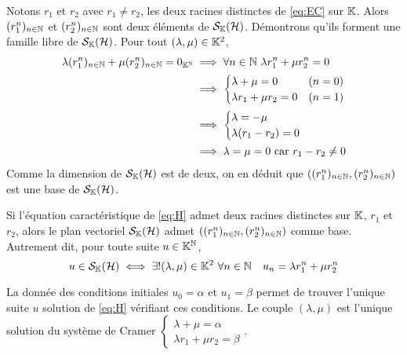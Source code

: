 Notons \(r_1\) et \(r_2\) avec \(r_1 \neq r_2\), les deux racines distinctes de \eqref{eq:EC} sur \(\mathbb{K}\). Alors \((r_1^n)_{n \in \mathbb{N}}\) et \((r_2^n)_{n \in \mathbb{N}}\) sont deux éléments de \(\mathcal{S}_{\mathbb{K}}(\mathcal{H})\). Démontrons qu'ils forment une famille libre de \(\mathcal{S}_{\mathbb{K}}(\mathcal{H})\). Pour tout \((\lambda, \mu) \in \mathbb{K}^2\),
\begin{align}
  \lambda (r_1^n)_{n \in \mathbb{N}} + \mu (r_2^n)_{n \in \mathbb{N}} = 0_{\mathbb{K}^{\mathbb{N}}} &\implies \forall n \in \mathbb{N} \ \lambda r_1^n + \mu r_2^n=0\\
                                                                  &\implies \begin{cases} \lambda + \mu =0 & (n=0) \\ \lambda r_1 +\mu r_2 = 0 & (n=1) \end{cases}\\
                                                                  &\implies \begin{cases} \lambda = -\mu \\ \lambda(r_1-r_2)=0 \end{cases}\\
                                                                  &\implies \lambda=\mu=0 \text{~car } r_1-r_2 \neq 0
\end{align}
Comme la dimension de \(\mathcal{S}_{\mathbb{K}}(\mathcal{H})\) est de deux, on en déduit que \(((r_1^n)_{n \in \mathbb{N}},(r_2^n)_{n \in \mathbb{N}})\) est une base de \(\mathcal{S}_{\mathbb{K}}(\mathcal{H})\).

\begin{theo}
  Si l'équation caractéristique de \eqref{eq:H} admet deux racines distinctes sur \(\mathbb{K}\), \(r_1\) et \(r_2\), alors le plan vectoriel \(\mathcal{S}_{\mathbb{K}}(\mathcal{H})\) admet \(((r_1^n)_{n \in \mathbb{N}},(r_2^n)_{n \in \mathbb{N}})\) comme base. Autrement dit, pour toute suite \(u \in \mathbb{K}^{\mathbb{N}}\),
  \begin{equation}
    u \in \mathcal{S}_{\mathbb{K}}(\mathcal{H}) \iff \exists! (\lambda,\mu) \in \mathbb{K}^2 \ \forall n \in \mathbb{N} \quad u_n = \lambda r_1^n +\mu r_2^n
  \end{equation}
\end{theo}

La donnée des conditions initiales \(u_0=\alpha\) et \(u_1=\beta\) permet de trouver l'unique suite \(u\) solution de \eqref{eq:H} vérifiant ces conditions. Le couple \((\lambda, \mu)\) est l'unique solution du système de Cramer \(\begin{cases} \lambda + \mu =\alpha \\ \lambda r_1+\mu r_2 =\beta \end{cases}\).

